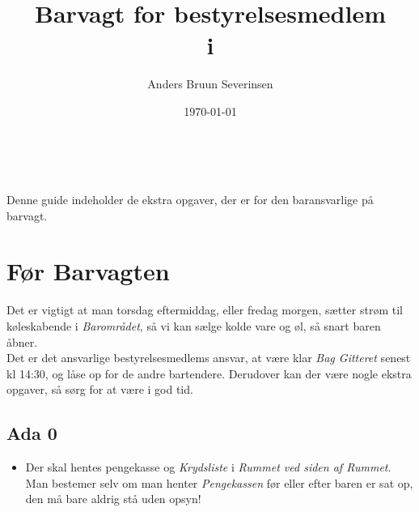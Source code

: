 

\title{Barvagt for bestyrelsesmedlem\\ i \fredagscafeen}
\date{\today}
\author{Anders Bruun Severinsen}



\maketitle

\tableofcontents \

Denne guide indeholder de ekstra opgaver,
der er for den baransvarlige på barvagt.

\section{Før Barvagten}
\label{sec:pre-barvagten}
Det er vigtigt at man torsdag eftermiddag, eller fredag morgen, sætter strøm til køleskabende i
\textit{Barområdet}, så vi kan sælge kolde vare og øl, så snart baren åbner.\\

Det er det ansvarlige bestyrelsesmedlems ansvar, at være klar \textit{Bag Gitteret} senest kl 14:30,
og låse op for de andre bartendere.
Derudover kan der være nogle ekstra opgaver, så sørg for at være i god tid.

\subsection{Ada 0}
\label{sec:pre:ada}

\begin{itemize}
    \item Der skal hentes pengekasse og \textit{Krydsliste} i \textit{Rummet ved siden af
    Rummet}. Man bestemer selv om man henter
    \textit{Pengekassen} før eller efter baren er sat op, den må bare aldrig stå uden opsyn!
\end{itemize}

